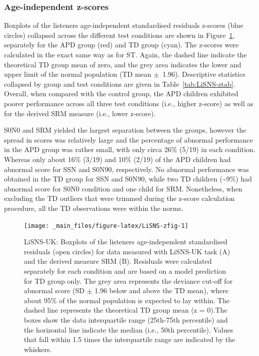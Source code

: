 \documentclass[a4paper, twoside]{templates/ociamthesis}
\begin{document}
\hypertarget{age-independent-z-scores-1}{%
\subsubsection*{Age-independent z-scores}\label{age-independent-z-scores-1}}

Boxplots of the listeners age-independent standardised residuals z-scores (blue circles) collapsed across the different test conditions are shown in Figure~\ref{fig:LiSNS-zfig}, separately for the APD group (red) and TD group (cyan). The z-scores were calculated in the exact same way as for ST. Again, the dashed line indicate the theoretical TD group mean of zero, and the grey area indicates the lower and upper limit of the normal population (TD mean \(\pm\)~1.96). Descriptive statistics collapsed by group and test conditions are given in Table~\ref{tab:LiSNS-ztab}. Overall, when compared with the control group, the APD children exhibited poorer performance across all three test conditions (i.e., higher z-score) as well as for the derived SRM measure (i.e., lower z-score).

S0N0 and SRM yielded the largest separation between the groups, however the spread in scores was relatively large and the percentage of abnormal performance in the APD group was rather small, with only circa 26\% (5/19) in each condition. Whereas only about 16\% (3/19) and 10\% (2/19) of the APD children had abnormal score for SSN and S0N90, respectively. No abnormal performance was obtained in the TD group for SSN and S0N90, while two TD children (\textasciitilde9\%) had abnormal score for S0N0 condition and one child for SRM. Nonetheless, when excluding the TD outliers that were trimmed during the z-score calculation procedure, all the TD observations were within the norms.\\

\begin{figure}

{\centering \texttt{[image: \_main\_files/figure-latex/LiSNS-zfig-1]} 

}

\caption{LiSNS-UK: Boxplots of the listeners age-independent standardised residuals (open circles) for data measured with LiSNS-UK task (A) and the derived measure SRM (B). Residuals were calculated separately for each condition and are based on a model prediction for TD group only. The grey area represents the deviance cut-off for abnormal score (SD $\pm$ 1.96 below and above the TD mean), where about 95\% of the normal population is expected to lay within. The dashed line represents the theoretical TD group mean (z = 0).The boxes show the data interquartile range (25th-75th percentile) and the horizontal line indicate the median (i.e., 50th percentile). Values that fall within 1.5 times the interquartile range are indicated by the whiskers.}\label{fig:LiSNS-zfig}
\end{figure}
\end{document}
